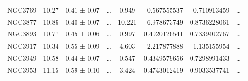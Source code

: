 \documentclass[reprint,%
 amsmath,amssymb,
 aps,
]{revtex4-1}
\begin{document}
\begin{table}[]
\begin{tabular}{cccccrrc}
\rowcolor[HTML]{F3F3F3} 
NGC3769              & 10.27                     & 0.41 ± 0.07           & …                      & 0.949                                                        & 0.567555537                                                           & 0.710913459                                                           & …                                                             \\
\rowcolor[HTML]{F3F3F3} 
NGC3877              & 10.86                     & 0.40 ± 0.07           & …                      & 10.221                                                       & 6.978673749                                                           & 0.8736228061                                                          & …                                                             \\
\rowcolor[HTML]{F3F3F3} 
NGC3893              & 10.77                     & 0.45 ± 0.06           & …                      & 0.997                                                        & 0.4020126541                                                          & 0.7339402767                                                          & …                                                             \\
\rowcolor[HTML]{F3F3F3} 
NGC3917              & 10.34                     & 0.55 ± 0.09           & …                      & 4.603                                                        & 2.217877888                                                           & 1.135155954                                                           & …                                                             \\
\rowcolor[HTML]{F3F3F3} 
NGC3949              & 10.58                     & 0.44 ± 0.07           & …                      & 0.547                                                        & 0.4349579656                                                          & 0.7298991433                                                          & …                                                             \\
\rowcolor[HTML]{F3F3F3} 
NGC3953              & 11.15                     & 0.59 ± 0.10           & …                      & 3.424                                                        & 0.4743012419                                                          & 0.9033537741                                                          & …                                                             \\

\end{tabular}
\end{table}
\end{document}
